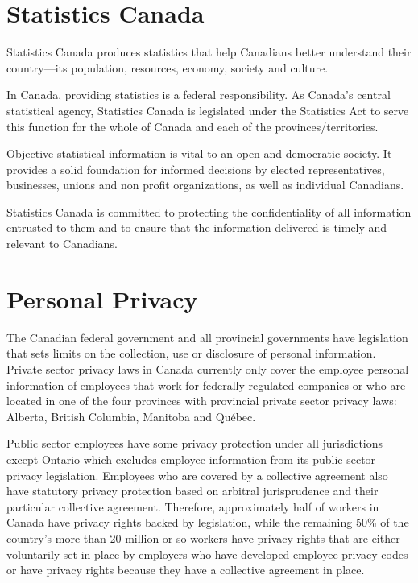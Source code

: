 \documentclass[letterpaper,10pt,english]{sphinxmanual}
\begin{document}
\section{Statistics Canada}
\label{\detokenize{2_compliance:statistics-canada}}
\sphinxAtStartPar
Statistics Canada produces statistics that help Canadians better understand their country—its
population, resources, economy, society and culture.

\sphinxAtStartPar
In Canada, providing statistics is a federal responsibility. As Canada’s central statistical
agency, Statistics Canada is legislated under the Statistics Act to serve this function for the
whole of Canada and each of the provinces/territories.

\sphinxAtStartPar
Objective statistical information is vital to an open and democratic society. It provides a solid
foundation for informed decisions by elected representatives, businesses, unions and non\sphinxhyphen{}
profit organizations, as well as individual Canadians.

\sphinxAtStartPar
Statistics Canada is committed to protecting the confidentiality of all information entrusted to
them and to ensure that the information delivered is timely and relevant to Canadians.


\section{Personal Privacy}
\label{\detokenize{2_compliance:personal-privacy}}
\sphinxAtStartPar
The Canadian federal government and all provincial governments have legislation that sets
limits on the collection, use or disclosure of personal information. Private sector privacy laws
in Canada currently only cover the employee personal information of employees that work
for federally regulated companies or who are located in one of the four provinces with
provincial private sector privacy laws: Alberta, British Columbia, Manitoba and Québec.

\sphinxAtStartPar
Public sector employees have some privacy protection under all jurisdictions except Ontario
which excludes employee information from its public sector privacy legislation. Employees
who are covered by a collective agreement also have statutory privacy protection based on
arbitral jurisprudence and their particular collective agreement. Therefore, approximately
half of workers in Canada have privacy rights backed by legislation, while the remaining
50\% of the country’s more than 20 million or so workers have privacy rights that are either
voluntarily set in place by employers who have developed employee privacy codes or have
privacy rights because they have a collective agreement in place.
\end{document}
